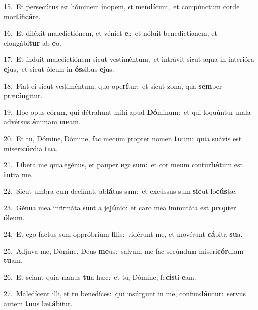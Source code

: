{\numbfont\textcolor{\numbcolor}{15.}}~Et persecútus est hóminem ínopem, et men\-\textbf{dí}\-cum,~\star et compúnctum corde mor\-\textbf{ti}\-fi\-\textbf{cá}\-re.\par
{\numbfont\textcolor{\numbcolor}{16.}}~Et diléxit maledictiónem, et véniet \textbf{e}\-i:~\star et nóluit benedictiónem, et elongábi\textbf{tur} ab \textbf{e}\-o.\par
{\numbfont\textcolor{\numbcolor}{17.}}~Et índuit maledictiónem sicut vestiméntum,~\dagger et intrávit sicut aqua in interióra \textbf{e}\-jus,~\star et sicut óleum in \textbf{ós}\-sibus \textbf{e}\-jus.\par
{\numbfont\textcolor{\numbcolor}{18.}}~Fiat ei sicut vestiméntum, quo ope\-\textbf{rí}\-tur:~\star et sicut zona, qua \textbf{sem}\-per præ\-\textbf{cín}\-gitur.\par
{\numbfont\textcolor{\numbcolor}{19.}}~Hoc opus eórum, qui détrahunt mihi apud \textbf{Dó}\-minum:~\star et qui loquúntur mala advérsus \textbf{á}\-nimam \textbf{me}\-am.\par
{\numbfont\textcolor{\numbcolor}{20.}}~Et tu, Dómine, Dómine, fac mecum propter nomen \textbf{tu}\-um:~\star quia suávis est miseri\-\textbf{cór}\-dia \textbf{tu}\-a.\par
{\numbfont\textcolor{\numbcolor}{21.}}~Líbera me quia egénus, et pauper \textbf{e}\-go sum:~\star et cor meum contur\-\textbf{bá}\-tum est \textbf{in}\-tra me.\par
{\numbfont\textcolor{\numbcolor}{22.}}~Sicut umbra cum declínat, ab\-\textbf{lá}\-tus sum:~\star et excússus sum \textbf{sic}\-ut lo\-\textbf{cús}\-tæ.\par
{\numbfont\textcolor{\numbcolor}{23.}}~Génua mea infirmáta sunt a je\-\textbf{jú}\-nio:~\star et caro mea immutáta est \textbf{prop}\-ter \textbf{ó}\-leum.\par
{\numbfont\textcolor{\numbcolor}{24.}}~Et ego factus sum oppróbrium \textbf{il}\-lis:~\star vidérunt me, et movérunt \textbf{cá}\-pita \textbf{su}\-a.\par
{\numbfont\textcolor{\numbcolor}{25.}}~Adjuva me, Dómine, Deus \textbf{me}\-us:~\star salvum me fac secúndum miseri\-\textbf{cór}\-diam \textbf{tu}\-am.\par
{\numbfont\textcolor{\numbcolor}{26.}}~Et sciant quia manus \textbf{tu}\-a hæc:~\star et tu, Dómine, fe\-\textbf{cís}\-ti \textbf{e}\-am.\par
{\numbfont\textcolor{\numbcolor}{27.}}~Maledícent illi, et tu benedíces:~\dagger qui insúrgunt in me, confun\-\textbf{dán}\-tur:~\star servus autem \textbf{tu}\-us læ\-\textbf{tá}\-bitur.\par

